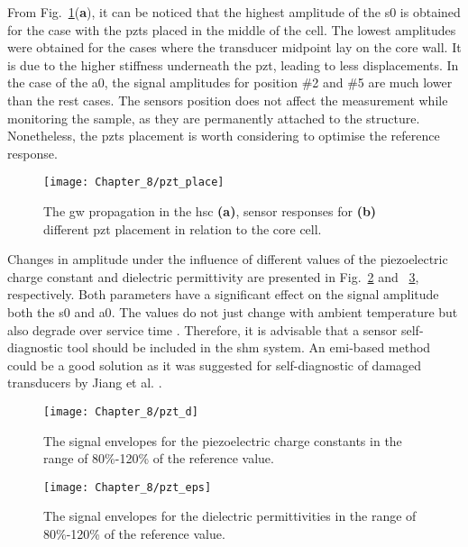 From Fig.~\ref{fig:pzt_place}(\textbf{a}), it can be noticed that the highest amplitude of the \ac{s0} is obtained for the case with the \acp{pzt} placed in the middle of the cell.
The lowest amplitudes were obtained for the cases where the transducer midpoint lay on the core wall.
It is due to the higher stiffness underneath the \ac{pzt}, leading to less displacements.
In the case of the \ac{a0}, the signal amplitudes for position \#2 and \#5 are much lower than the rest cases.
The sensors position does not affect the measurement while monitoring the sample, as they are permanently attached to the structure. 
Nonetheless, the \acp{pzt} placement is worth considering to optimise the reference response.
\begin{figure}
	\begin{center}
		\texttt{[image: Chapter\_8/pzt\_place]}
	\end{center}
	\caption{The \acf{gw} propagation in the \acf{hsc} \textbf{(a)}, sensor responses for \textbf{(b)} different \acf{pzt} placement in relation to the core cell.}
	\label{fig:pzt_place}
\end{figure}

Changes in amplitude under the influence of different values of the piezoelectric charge constant and dielectric permittivity are presented in Fig.~\ref{fig:pzt_d} and ~\ref{fig:pzt_eps}, respectively.
Both parameters have a significant effect on the signal amplitude both the \ac{s0} and \ac{a0}.
The values do not just change with ambient temperature but also degrade over service time \cite{barzegar2001aging, deangelis2006p2o}.
Therefore, it is advisable that a sensor self-diagnostic tool should be included in the \ac{shm} system. 
An \ac{emi}-based method could be a good solution as it was suggested for self-diagnostic of damaged transducers by Jiang et al. \cite{jiang2021electromechanical}.

\begin{figure}
	\begin{center}
		\texttt{[image: Chapter\_8/pzt\_d]}
	\end{center}
	\caption{The signal envelopes for the piezoelectric charge constants in the range of 80\%-120\% of the reference value.}
	\label{fig:pzt_d}
\end{figure}

\begin{figure}
	\begin{center}
		\texttt{[image: Chapter\_8/pzt\_eps]}
	\end{center}
	\caption{The signal envelopes for the dielectric permittivities in the range of 80\%-120\% of the reference value.}
	\label{fig:pzt_eps}
\end{figure}


